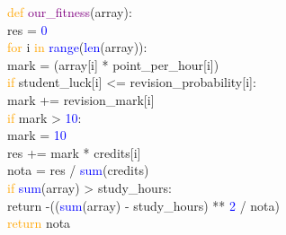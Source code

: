 \documentclass[11pt, a4paper, titlepage]{article}
\begin{document}
\textcolor{orange}{def} \textcolor{purple}{our\_fitness}(array):\\\hspace*{1em} res = \textcolor{blue}{0}\\
\hspace*{1em} \textcolor{orange}{for} i \textcolor{orange}{in} \textcolor{blue}{range}(\textcolor{blue}{len}(array)):\\
\hspace*{2em} mark = (array[i] * point\_per\_hour[i])\\
\hspace*{2em} \textcolor{orange}{if} student\_luck[i] <= revision\_probability[i]:\\
\hspace*{3em} mark += revision\_mark[i]\\
\hspace*{2em} \textcolor{orange}{if} mark > \textcolor{blue}{10}:\\
\hspace*{3em} mark = \textcolor{blue}{10}\\
\hspace*{2em} res += mark * credits[i]\\
\hspace*{1em} nota = res / \textcolor{blue}{sum}(credits)\\
\hspace*{1em} \textcolor{orange}{if} \textcolor{blue}{sum}(array) > study\_hours:\\
\hspace*{2em} return -((\textcolor{blue}{sum}(array) - study\_hours) ** \textcolor{blue}{2} / nota)\\
\hspace*{1em} \textcolor{orange}{return} nota\\

\vspace{5mm}
\end{document}
